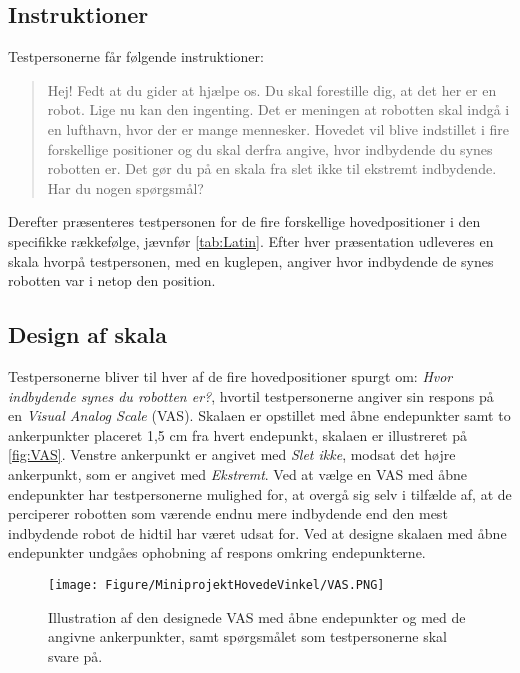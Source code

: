 \subsection{Instruktioner}
\label{SkaleringseksperimentInstruktioner}
%
Testpersonerne får følgende instruktioner: 
%
\begin{quotation}
\noindent
Hej!\blankline
%
Fedt at du gider at hjælpe os. Du skal forestille dig, at det her er en robot. Lige nu kan den ingenting. Det er meningen at robotten skal indgå i en lufthavn, hvor der er mange mennesker. Hovedet vil blive indstillet i fire forskellige positioner og du skal derfra angive, hvor indbydende du synes robotten er. Det gør du på en skala fra slet ikke til ekstremt indbydende.\blankline
%
Har du nogen spørgsmål?
\end{quotation}
%
Derefter præsenteres testpersonen for de fire forskellige hovedpositioner i den specifikke rækkefølge, jævnfør \autoref{tab:Latin}. Efter hver præsentation udleveres en skala hvorpå testpersonen, med en kuglepen, angiver hvor indbydende de synes robotten var i netop den position.  
%

\subsection{Design af skala}
\label{SkaleringseksperimentDesignAfSkala}
%
Testpersonerne bliver til hver af de fire hovedpositioner spurgt om: \textit{Hvor indbydende synes du robotten er?}, hvortil testpersonerne angiver sin respons på en \textit{Visual Analog Scale} (VAS). Skalaen er opstillet med åbne endepunkter samt to ankerpunkter placeret 1,5 cm fra hvert endepunkt, skalaen er illustreret på \autoref{fig:VAS}. Venstre ankerpunkt er angivet med \textit{Slet ikke}, modsat det højre ankerpunkt, som er angivet med \textit{Ekstremt}. Ved at vælge en VAS med åbne endepunkter har testpersonerne mulighed for, at overgå sig selv i tilfælde af, at de perciperer robotten som værende endnu mere indbydende end den mest indbydende robot de hidtil har været udsat for. Ved at designe skalaen med åbne endepunkter undgåes ophobning af respons omkring endepunkterne. 
%
\begin{figure}[H]
\centering
\texttt{[image: Figure/MiniprojektHovedeVinkel/VAS.PNG]} 
\caption{Illustration af den designede VAS med åbne endepunkter og med de angivne ankerpunkter, samt spørgsmålet som testpersonerne skal svare på.}
\label{fig:VAS}
\end{figure}
\noindent 
%